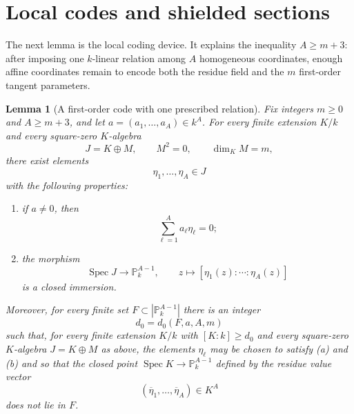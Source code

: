 \documentclass{lms}
\newtheorem{lemma}[theorem]{Lemma}
\newenvironment{alphlist}
  {\begin{enumerate}[b]\renewcommand{\theenumi}{\textup{(\alph{enumi})}}}
  {\end{enumerate}}
\DeclareMathOperator{\Spec}{Spec}
\newcommand{\PP}{\mathbb P}
\begin{document}
\section{Local codes and shielded sections}\label{sec:local-shield}

The next lemma is the local coding device.  It explains the inequality $A\ge m+3$: after imposing one $k$-linear relation among $A$ homogeneous coordinates, enough affine coordinates remain to encode both the residue field and the $m$ first-order tangent parameters.

\begin{lemma}[A first-order code with one prescribed relation]\label{lem:localcode}
Fix integers $m\ge0$ and $A\ge m+3$, and let $a=(a_1,\ldots,a_A)\in k^A$.  For every finite extension $K/k$ and every square-zero $K$-algebra
\[
        J=K\oplus M,
        \qquad
        M^2=0,
        \qquad
        \dim_K M=m,
\]
there exist elements
\[
        \eta_1,\ldots,\eta_A\in J
\]
with the following properties:
\begin{alphlist}
\item if $a\ne0$, then
\[
        \sum_{\ell=1}^{A}a_\ell\eta_\ell=0;
\]
\item the morphism
\[
        \Spec J\longrightarrow\PP^{A-1}_k,
        \qquad
        z\longmapsto [\eta_1(z):\cdots:\eta_A(z)]
\]
is a closed immersion.
\end{alphlist}
Moreover, for every finite set $F\subset |\PP^{A-1}_k|$ there is an integer
\[
        d_0=d_0(F,a,A,m)
\]
such that, for every finite extension $K/k$ with $[K:k]\ge d_0$ and every square-zero $K$-algebra $J=K\oplus M$ as above, the elements $\eta_\ell$ may be chosen to satisfy \textup{(a)} and \textup{(b)} and so that the closed point $\Spec K\to\PP^{A-1}_k$ defined by the residue value vector
\[
        (\overline\eta_1,\ldots,\overline\eta_A)\in K^A
\]
does not lie in $F$.
\end{lemma}
\end{document}
